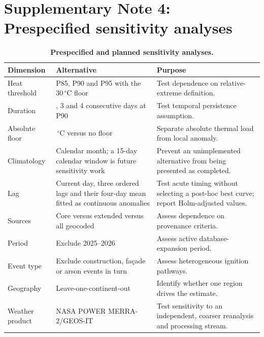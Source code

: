 \documentclass[11pt]{article}
\begin{document}
\section*{Supplementary Note 4: Prespecified sensitivity analyses}
\begin{longtable}{>{\raggedright\arraybackslash}p{}>{\raggedright\arraybackslash}p{}>{\raggedright\arraybackslash}p{}}
\caption{\textbf{Prespecified and planned sensitivity analyses.}}\label{tab:s2}\\
\toprule
Dimension & Alternative & Purpose\\
\midrule
Heat threshold & P85, P90 and P95 with the 30\,$^\circ$C floor & Test dependence on relative-extreme definition.\\
Duration & 2, 3 and 4 consecutive days at P90 & Test temporal persistence assumption.\\
Absolute floor & 30\,$^\circ$C versus no floor & Separate absolute thermal load from local anomaly.\\
Climatology & Calendar month; a 15-day calendar window is future sensitivity work & Prevent an unimplemented alternative from being presented as completed.\\
Lag & Current day, three ordered lags and their four-day mean fitted as continuous anomalies & Test acute timing without selecting a post-hoc best curve; report Holm-adjusted values.\\
Sources & Core versus extended versus all geocoded & Assess dependence on provenance criteria.\\
Period & Exclude 2025--2026 & Assess active database-expansion period.\\
Event type & Exclude construction, façade or arson events in turn & Assess heterogeneous ignition pathways.\\
Geography & Leave-one-continent-out & Identify whether one region drives the estimate.\\
Weather product & NASA POWER MERRA-2/GEOS-IT & Test sensitivity to an independent, coarser reanalysis and processing stream.\\
\bottomrule
\end{longtable}
\end{document}

